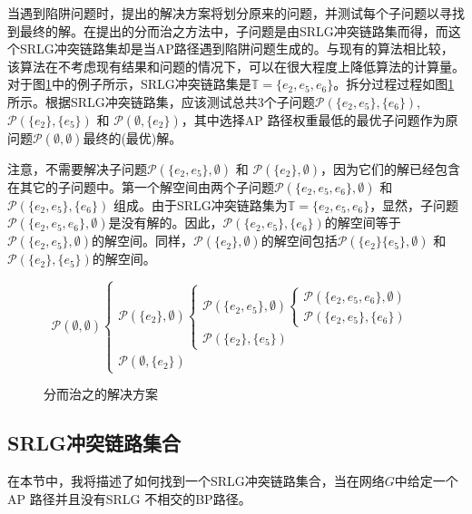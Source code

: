 当遇到陷阱问题时，提出的解决方案将划分原来的问题，并测试每个子问题以寻找到最终的解。在提出的分而治之方法中，子问题是由SRLG冲突链路集而得，而这个SRLG冲突链路集却是当AP路径遇到陷阱问题生成的。与现有的算法相比较，该算法在不考虑现有结果和问题的情况下，可以在很大程度上降低算法的计算量。对于图\ref{fig:DividedConquer}中的例子所示，SRLG冲突链路集是$\mathbb{T}=\{e_2,e_5,e_6\}$。拆分过程过程如图\ref{fig:DividedConquer} 所示。根据SRLG冲突链路集，应该测试总共3个子问题${{\mathcal{P}}(\{ e_2,e_5\} ,\{ e_6\} )}$, ${{\mathcal{P}}(\{ e_2\} ,\{ e_5\} )}$ 和 ${{\mathcal{P}}(\emptyset ,\{ e_2\} )}$，其中选择AP 路径权重最低的最优子问题作为原问题$\mathcal{P}(\emptyset,\emptyset)$最终的(最优)解。

注意，不需要解决子问题${{\mathcal{P}}(\{ e_2,e_5\}, \emptyset)}$ 和 ${{\mathcal{P}}(\{ e_2\},\emptyset )}$，因为它们的解已经包含在其它的子问题中。第一个解空间由两个子问题${{\mathcal P}(\{ e_2,e_5,e_6\} ,\emptyset )}$ 和 ${{\mathcal P}(\{ e_2,e_5\} ,\{ e_6\} )}$ 组成。由于SRLG冲突链路集为$\mathbb{T}=\{e_2,e_5,e_6\}$，显然，子问题${{\mathcal P}(\{ e_2,e_5,e_6\} ,\emptyset )}$是没有解的。因此，${{\mathcal P}(\{ e_2,e_5\} ,\{ e_6\} )}$的解空间等于${{\mathcal{P}}(\{ e_2, e_5\}, \emptyset)}$的解空间。同样，${{\mathcal{P}}(\{ e_2\},\emptyset )}$的解空间包括${{\mathcal{P}}(\{ e_2\} \{ e_5\}, \emptyset)}$  和 ${{\mathcal{P}}(\{ e_2\} ,\{ e_5\} )}$的解空间。
\begin{figure}[htbp]
\large{
\begin{equation*}
{\mathcal P}(\emptyset ,\emptyset )\left\{ {\begin{array}{*{20}{l}}
{{\mathcal P}(\{ e_2\} ,\emptyset )\left\{ {\begin{array}{*{20}{l}}
{{\mathcal P}(\{ e_2,e_5\} ,\emptyset )\left\{ {\begin{array}{*{20}{l}}
{{\mathcal P}(\{ e_2,e_5,e_6\} ,\emptyset )}\\
{\boxed{{\mathcal P}(\{ e_2,e_5\} ,\{ e_6\} )}}
\end{array}} \right.}\\
{\boxed{{\mathcal P}(\{ e_2\} ,\{ e_5\} )}}
\end{array}} \right.}\\
{\boxed{{\mathcal P}(\emptyset ,\{ e_2\} )}}
\end{array}} \right.
\end{equation*}
}
\caption{分而治之的解决方案}
\label{fig:DividedConquer}
\end{figure}




\subsection{SRLG冲突链路集合}
在本节中，我将描述了如何找到一个SRLG冲突链路集合，当在网络$G$中给定一个AP 路径并且没有SRLG 不相交的BP路径。
